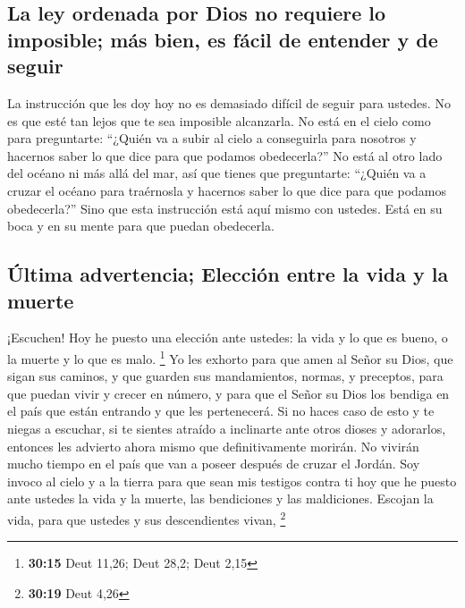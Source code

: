\hypertarget{la-ley-ordenada-por-dios-no-requiere-lo-imposible-muxe1s-bien-es-fuxe1cil-de-entender-y-de-seguir}{%
\subsection{La ley ordenada por Dios no requiere lo imposible; más bien,
es fácil de entender y de
seguir}\label{la-ley-ordenada-por-dios-no-requiere-lo-imposible-muxe1s-bien-es-fuxe1cil-de-entender-y-de-seguir}}

 La instrucción que les doy hoy no es demasiado difícil
de seguir para ustedes. No es que esté tan lejos que te sea imposible
alcanzarla.  No está en el cielo como para preguntarte:
``¿Quién va a subir al cielo a conseguirla para nosotros y hacernos
saber lo que dice para que podamos obedecerla?''  No está
al otro lado del océano ni más allá del mar, así que tienes que
preguntarte: ``¿Quién va a cruzar el océano para traérnosla y hacernos
saber lo que dice para que podamos obedecerla?''  Sino
que esta instrucción está aquí mismo con ustedes. Está en su boca y en
su mente para que puedan obedecerla.

\hypertarget{uxfaltima-advertencia-elecciuxf3n-entre-la-vida-y-la-muerte}{%
\subsection{Última advertencia; Elección entre la vida y la
muerte}\label{uxfaltima-advertencia-elecciuxf3n-entre-la-vida-y-la-muerte}}

 ¡Escuchen! Hoy he puesto una elección ante ustedes: la
vida y lo que es bueno, o la muerte y lo que es malo. \footnote{\textbf{30:15}
  Deut 11,26; Deut 28,2; Deut 2,15}  Yo les exhorto para
que amen al Señor su Dios, que sigan sus caminos, y que guarden sus
mandamientos, normas, y preceptos, para que puedan vivir y crecer en
número, y para que el Señor su Dios los bendiga en el país que están
entrando y que les pertenecerá.  Si no haces caso de esto
y te niegas a escuchar, si te sientes atraído a inclinarte ante otros
dioses y adorarlos,  entonces les advierto ahora mismo
que definitivamente morirán. No vivirán mucho tiempo en el país que van
a poseer después de cruzar el Jordán.  Soy invoco al
cielo y a la tierra para que sean mis testigos contra ti hoy que he
puesto ante ustedes la vida y la muerte, las bendiciones y las
maldiciones. Escojan la vida, para que ustedes y sus descendientes
vivan, \footnote{\textbf{30:19} Deut 4,26}

